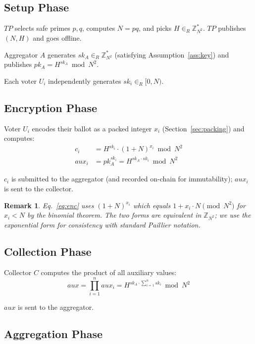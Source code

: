 \documentclass[11pt, a4paper]{article}
\newtheorem{remark}[theorem]{Remark}
\begin{document}
\subsection{Setup Phase}

$TP$ selects safe primes $p, q$, computes $N = pq$, and picks $H \in_R \mathbb{Z}_{N^2}^*$. $TP$ publishes $(N, H)$ and goes offline.

Aggregator $A$ generates $sk_A \in_R \mathbb{Z}_{N^2}^*$ (satisfying Assumption~\ref{ass:key}) and publishes $pk_A = H^{sk_A} \bmod N^2$.

Each voter $U_i$ independently generates $sk_i \in_R [0, N)$.

\subsection{Encryption Phase}

Voter $U_i$ encodes their ballot as a packed integer $x_i$ (Section~\ref{sec:packing}) and computes:
\begin{align}
c_i &= H^{sk_i} \cdot (1 + N)^{x_i} \bmod N^2 \label{eq:enc}\\
aux_i &= pk_A^{sk_i} = H^{sk_A \cdot sk_i} \bmod N^2 \label{eq:auxenc}
\end{align}

$c_i$ is submitted to the aggregator (and recorded on-chain for immutability); $aux_i$ is sent to the collector.

\begin{remark}
Eq.~\ref{eq:enc} uses $(1+N)^{x_i}$ which equals $1 + x_i \cdot N \pmod{N^2}$ for $x_i < N$ by the binomial theorem. The two forms are equivalent in $\mathbb{Z}_{N^2}$; we use the exponential form for consistency with standard Paillier notation.
\end{remark}

\subsection{Collection Phase}

Collector $C$ computes the product of all auxiliary values:
\begin{equation}
aux = \prod_{i=1}^{n} aux_i = H^{sk_A \cdot \sum_{i=1}^n sk_i} \bmod N^2 \label{eq:collect2}
\end{equation}

$aux$ is sent to the aggregator.

\subsection{Aggregation Phase}
\end{document}
